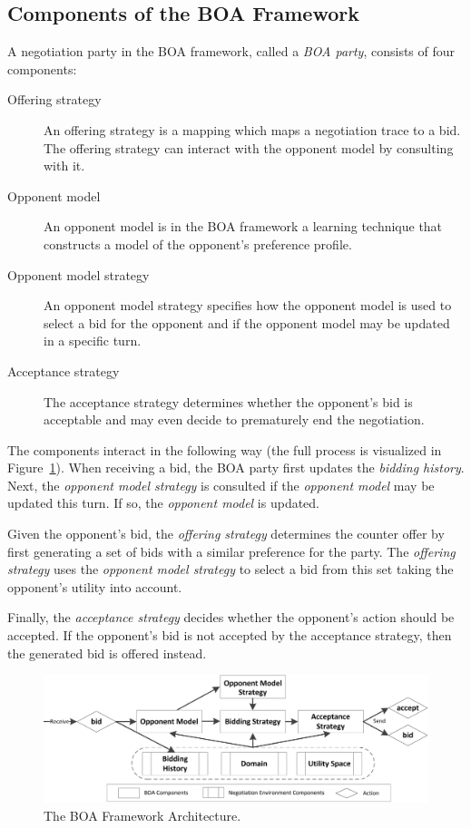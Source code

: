 \documentclass[]{article}
\begin{document}
\subsection{Components of the BOA Framework}
A negotiation party in the BOA framework, called a \textit{BOA party}, consists of four components:
\begin{description}
  \item[Offering strategy] An offering strategy is a mapping which maps a negotiation trace to a bid. The offering strategy can interact with the opponent model by consulting with it.%

  \item[Opponent model] An opponent model is in the BOA framework a learning technique that constructs a model of the opponent's preference profile.%
  \item[Opponent model strategy] An opponent model strategy specifies how the opponent model is used to select a bid for the opponent and if the opponent model may be updated in a specific turn.
  \item[Acceptance strategy] The acceptance strategy determines whether the opponent's bid is acceptable and may even decide to prematurely end the negotiation.
\end{description}
The components interact in the following way (the full process is visualized in Figure~\ref{fig:flowchart}). When receiving a bid, the BOA party first  updates the \textit{bidding history}. Next, the \textit{opponent model strategy} is consulted if the \textit{opponent model} may be updated this turn. If so, the \textit{opponent model} is updated.

Given the opponent's bid, the \textit{offering strategy} determines the counter offer by first generating a set of bids with a similar preference for the party. The \textit{offering strategy} uses the \textit{opponent model strategy} to select a bid from this set taking the opponent's utility into account.

Finally, the \textit{acceptance strategy} decides whether the opponent's action should be accepted. If the opponent's bid is not accepted by the acceptance strategy, then the generated bid is offered instead.

\begin{figure}[t] 
	\center
	\includegraphics[width=15.0cm]{media/BOAflow.png}
	\caption{The BOA Framework Architecture.}
	\label{fig:flowchart}
\end{figure}
\end{document}
